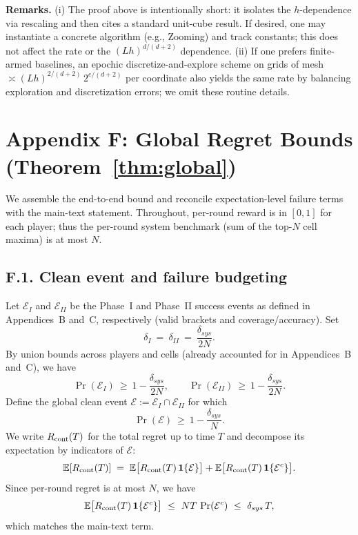 \noindent\textbf{Remarks.}
(i) The proof above is intentionally short: it isolates the $h$-dependence via rescaling and then cites a standard unit-cube result. If desired, one may instantiate a concrete algorithm (e.g., Zooming) and track constants; this does not affect the rate or the $(Lh)^{d/(d+2)}$ dependence.
(ii) If one prefers finite-armed baselines, an epochic discretize-and-explore scheme on grids of mesh $\asymp (Lh)^{2/(d+2)}\,2^{e/(d+2)}$ per coordinate also yields the same rate by balancing exploration and discretization errors; we omit these routine details.


\section*{Appendix F: Global Regret Bounds (Theorem~\ref{thm:global})}
\label{app:global}

We assemble the end-to-end bound and reconcile expectation-level failure terms with the main-text statement. Throughout, per-round reward is in $[0,1]$ for each player; thus the per-round system benchmark (sum of the top-$N$ cell maxima) is at most $N$.

\subsection*{F.1.\; Clean event and failure budgeting}

Let $\mathcal{E}_I$ and $\mathcal{E}_{II}$ be the Phase~I and Phase~II success events as defined in Appendices~B and~C, respectively (valid brackets and coverage/accuracy).
Set
\[
\delta_{I}\ =\ \delta_{II}\ =\ \frac{\delta_{sys}}{2N}.
\]
By union bounds across players and cells (already accounted for in Appendices~B and~C), we have
\[
\Pr(\mathcal{E}_I)\ \ge\ 1-\frac{\delta_{sys}}{2N},
\qquad
\Pr(\mathcal{E}_{II})\ \ge\ 1-\frac{\delta_{sys}}{2N}.
\]
Define the global clean event $\mathcal E:=\mathcal E_I\cap \mathcal E_{II}$ for which
\begin{equation}
\label{eq:clean-event-budget}
\Pr(\mathcal E)\ \ge\ 1-\frac{\delta_{sys}}{N}.
\end{equation}
We write $R_{\mathrm{cont}}(T)$ for the total regret up to time $T$ and decompose its expectation by indicators of $\mathcal E$:
\[
\mathbb{E}[R_{\mathrm{cont}}(T)]
\;=\;
\mathbb{E}\big[R_{\mathrm{cont}}(T)\,\mathbf 1\{\mathcal E\}\big]
+\mathbb{E}\big[R_{\mathrm{cont}}(T)\,\mathbf 1\{\mathcal E^c\}\big].
\]
Since per-round regret is at most $N$, we have
\begin{equation}
\label{eq:failure-expectation}
\mathbb{E}\big[R_{\mathrm{cont}}(T)\,\mathbf 1\{\mathcal E^c\}\big]
\ \le\ N T \,\Pr(\mathcal E^c)
\ \le\ \delta_{sys}\, T,
\end{equation}
which matches the main-text term.

